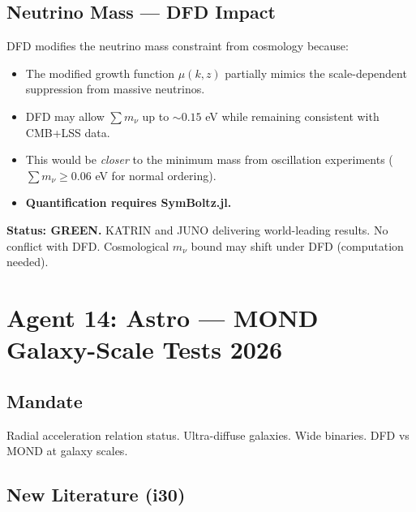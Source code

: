 \documentclass[11pt,a4paper]{article}
\newcommand{\GREEN}{\textcolor{dfdgreen}{\textbf{GREEN}}}
\begin{document}
\subsection{Neutrino Mass --- DFD Impact}

DFD modifies the neutrino mass constraint from cosmology because:
\begin{itemize}
\item The modified growth function $\mu(k,z)$ partially mimics the scale-dependent suppression from massive neutrinos.
\item DFD may allow $\sum m_\nu$ up to $\sim 0.15$ eV while remaining consistent with CMB+LSS data.
\item This would be \emph{closer} to the minimum mass from oscillation experiments ($\sum m_\nu \geq 0.06$ eV for normal ordering).
\item \textbf{Quantification requires SymBoltz.jl.}
\end{itemize}

\textbf{Status: \GREEN.} KATRIN and JUNO delivering world-leading results. No conflict with DFD. Cosmological $m_\nu$ bound may shift under DFD (computation needed).

\section{Agent 14: Astro --- MOND Galaxy-Scale Tests 2026}

\subsection{Mandate}
Radial acceleration relation status. Ultra-diffuse galaxies. Wide binaries. DFD vs MOND at galaxy scales.

\subsection{New Literature (i30)}
\end{document}
